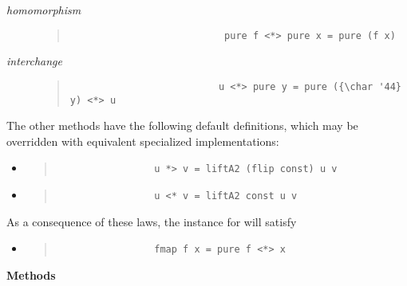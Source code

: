 \begin{haddockdesc}
\begin{description}
\item[\emph{homomorphism}] \begin{quote}
                           {\haddockverb\begin{verbatim}
                           pure f <*> pure x = pure (f x)\end{verbatim}}
                           \end{quote}
                           
\item[\emph{interchange}] \begin{quote}
                          {\haddockverb\begin{verbatim}
                          u <*> pure y = pure ({\char '44} y) <*> u\end{verbatim}}
                          \end{quote}
                          
\end{description}The other methods have the following default definitions, which may
 be overridden with equivalent specialized implementations:\par
                 \begin{itemize}
                 \item
                 \begin{quote}
                 {\haddockverb\begin{verbatim}
                 u *> v = liftA2 (flip const) u v\end{verbatim}}
                 \end{quote}
                 
                 \item
                 \begin{quote}
                 {\haddockverb\begin{verbatim}
                 u <* v = liftA2 const u v\end{verbatim}}
                 \end{quote}
                 
                 \end{itemize}
                 As a consequence of these laws, the  instance for  will satisfy\par
                 \begin{itemize}
                 \item
                 \begin{quote}
                 {\haddockverb\begin{verbatim}
                 fmap f x = pure f <*> x\end{verbatim}}
                 \end{quote}
                 
                 \end{itemize}
                 
\haddockpremethods{}\textbf{Methods}
\end{haddockdesc}
